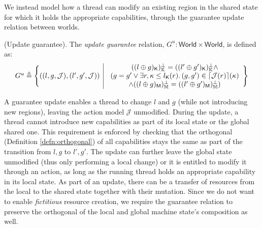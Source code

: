 We instead model how a thread can modify an existing region in the shared state for which it holds the appropriate capabilities, through the guarantee update relation between worlds.
\begin{defn}
	(Update guarantee).
	The \emph{update guarantee} relation, $G^u : \mathsf{World} \times \mathsf{World}$, is defined as:
	\[
	\begin{array}{r | l}
		G^u \triangleq \Bigg\{ ((l, g, \mathcal{J}), (l', g', \mathcal{J}))
		&
		\begin{array}{c}
			((l \oplus g)_\mathsf{K})_\mathbb{K}^\bot = ((l' \oplus g')_\mathsf{K})_\mathbb{K}^\bot \land \\
			(g = g' \lor \exists r, \kappa \leq l_\mathsf{K}(r) \ldotp (g, g') \in \lceil \mathcal{J}(r) \rceil(\kappa)  \\ \land ((l \oplus g)_\mathsf{M})_\mathbb{M}^\bot = ((l' \oplus g')_\mathsf{M})_\mathbb{M}^\bot )
		\end{array}
		\Bigg\}
	\end{array}
	\]
\end{defn}
A guarantee update enables a thread to change $l$ and $g$ (while not introducing new regions), leaving the action model $\mathcal{J}$ unmodified. During the update, a thread cannot introduce new capabilities as part of its local state or the global shared one. This requirement is enforced by checking that the orthogonal (Definition \ref{defn:orthogonal}) of all capabilities stays the same as part of the transition from $l, g$ to $l', g'$. The update can further leave the global state unmodified (thus only performing a local change) or it is entitled to modify it through an action, as long as the running thread holds an appropriate capability in its local state. As part of an update, there can be a transfer of resources from the local to the shared state together with their mutation. Since we do not want to enable \textit{fictitious} resource creation, we require the guarantee relation to preserve the orthogonal of the local and global machine state's composition as well.

